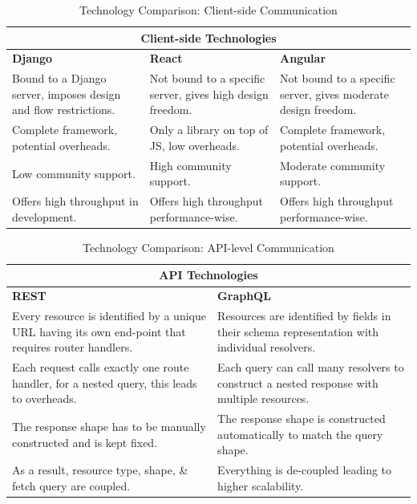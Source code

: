 \begin{table}[H]
\begin{tabular}{ @{}|p{5cm}|p{5cm}|p{5cm}|  }
 \hline
 \multicolumn{3}{|c|}{\textbf{Client-side Technologies}} \\
 \hline
 \textbf{Django} & \textbf{React} & \textbf{Angular} \\
 \hline
 Bound to a Django server, imposes design and flow restrictions.  & Not bound to a specific server, gives high design freedom.  & Not bound to a specific server, gives moderate design freedom.\\
  \hline
Complete framework, potential overheads. & Only a library on top of JS, low overheads.  & Complete framework, potential overheads.\\
 \hline
 Low community support. &  High community support. & Moderate community support. \\
  \hline
Offers high throughput in development. & Offers high throughput performance-wise. & Offers high throughput performance-wise.\\
 \hline
\end{tabular}
\caption{Technology Comparison: Client-side Communication \cite{paperReact}}
\label{table:tech-client}
\end{table}

\begin{table}[H]
\begin{tabular}{ @{}|p{7cm}|p{7cm}|  }
 \hline
 \multicolumn{2}{|c|}{\textbf{API Technologies}} \\
 \hline
 \textbf{REST} & \textbf{GraphQL} \\
 \hline
 Every resource is identified by a unique URL having its own end-point that requires router handlers.  & Resources are identified by fields in their schema representation with individual resolvers.\\
 \hline
 Each request calls exactly one route handler, for a nested query, this leads to overheads. & Each query can call many resolvers to construct a nested response with multiple resources. \\ 
 \hline
 The response shape has to be manually constructed and is kept fixed. &  The response shape is constructed automatically to match the query shape.  \\
  \hline
 As a result, resource type, shape, \& fetch query are coupled.  & Everything is de-coupled leading to higher scalability.\\
 \hline
\end{tabular}
\caption{Technology Comparison: API-level Communication \cite{paperGraphql} \cite{paperAPI}}
\label{table:tech-api}
\end{table} 

